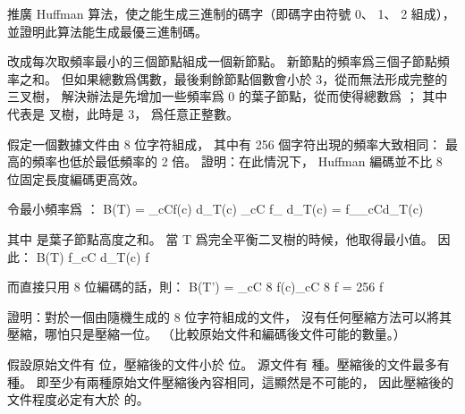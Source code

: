 \startEXERCISE
推廣 Huffman 算法，使之能生成三進制的碼字（即碼字由符號 0、 1、 2 組成），
並證明此算法能生成最優三進制碼。
\stopEXERCISE

\startANSWER
改成每次取頻率最小的三個節點組成一個新節點。
新節點的頻率爲三個子節點頻率之和。
但如果總數爲偶數，最後剩餘節點個數會小於 3，從而無法形成完整的三叉樹，
解決辦法是先增加一些頻率爲 0 的葉子節點，從而使得總數爲 ；
其中  代表是  叉樹，此時是 3，  爲任意正整數。
\stopANSWER

\startEXERCISE
假定一個數據文件由 8 位字符組成，
其中有 256 個字符出現的頻率大致相同：
最高的頻率也低於最低頻率的 2 倍。
證明：在此情況下， Huffman 編碼並不比 8 位固定長度編碼更高效。
\stopEXERCISE

\startANSWER
令最小頻率爲 ：
\startformula
B(T) = \sum_{c\in C}f(c) d_{T}(c) \ge \sum_{c\in C} f_{\min} \times d_{T}(c) = f_{\min}\times\sum_{c\in C}d_{T}(c)
\stopformula

其中  是葉子節點高度之和。
當 T 爲完全平衡二叉樹的時候，他取得最小值。
因此：
\startformula
B(T) \ge f\times \sum_{c\in C} d_{T}(c) \ge f 
\stopformula

而直接只用 8 位編碼的話，則：
\startformula
B(T') = \sum_{c\in C} 8 \times f(c)\le \sum_{c\in C} 8  \times f = 256   \times f
\stopformula
\stopANSWER

\startEXERCISE
證明：對於一個由隨機生成的 8 位字符組成的文件，
沒有任何壓縮方法可以將其壓縮，哪怕只是壓縮一位。
（\hint 比較原始文件和編碼後文件可能的數量。）
\stopEXERCISE

\startANSWER
假設原始文件有  位，壓縮後的文件小於  位。
源文件有  種。壓縮後的文件最多有  種。
即至少有兩種原始文件壓縮後內容相同，這顯然是不可能的，
因此壓縮後的文件程度必定有大於  的。
\stopANSWER

\stopsection
